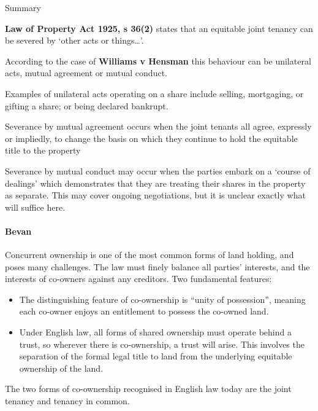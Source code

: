 \documentclass[
]{article}
\providecommand{\tightlist}{%
  \setlength{\itemsep}{0pt}\setlength{\parskip}{0pt}}
\newenvironment{env-d6ce83a0-f7a8-46b6-be95-b1235f1feb63}
{
    \savenotes\tcolorbox[blanker,breakable,left=5pt,borderline west={2pt}{-4pt}{gray}]
}
{
    \endtcolorbox\spewnotes
}
\begin{document}
\begin{env-d6ce83a0-f7a8-46b6-be95-b1235f1feb63}

Summary

\textbf{Law of Property Act 1925, s 36(2)} states that an equitable
joint tenancy can be severed by `other acts or things\ldots'.

According to the case of \textbf{Williams v Hensman} this behaviour can
be unilateral acts, mutual agreement or mutual conduct.

Examples of unilateral acts operating on a share include selling,
mortgaging, or gifting a share; or being declared bankrupt.

Severance by mutual agreement occurs when the joint tenants all agree,
expressly or impliedly, to change the basis on which they continue to
hold the equitable title to the property

Severance by mutual conduct may occur when the parties embark on a
`course of dealings' which demonstrates that they are treating their
shares in the property as separate. This may cover ongoing negotiations,
but it is unclear exactly what will suffice here.

\end{env-d6ce83a0-f7a8-46b6-be95-b1235f1feb63}

\hypertarget{bevan-1}{%
\paragraph{Bevan}\label{bevan-1}}

Concurrent ownership is one of the most common forms of land holding,
and poses many challenges. The law must finely balance all parties'
interests, and the interests of co-owners against any creditors. Two
fundamental features:

\begin{itemize}
\tightlist
\item
  The distinguishing feature of co-ownership is ``unity of possession'',
  meaning each co-owner enjoys an entitlement to possess the co-owned
  land.
\item
  Under English law, all forms of shared ownership must operate behind a
  trust, so wherever there is co-ownership, a trust will arise. This
  involves the separation of the formal legal title to land from the
  underlying equitable ownership of the land.
\end{itemize}

The two forms of co-ownership recognised in English law today are the
joint tenancy and tenancy in common.
\end{document}

